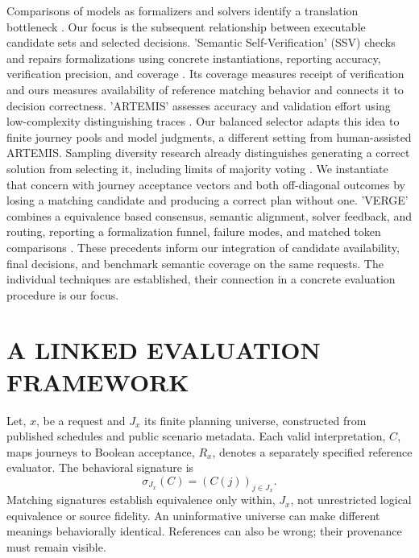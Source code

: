 \documentclass[a4paper,twoside]{article}
\begin{document}
Comparisons of models as formalizers and solvers identify a translation bottleneck \cite{amonkar}. Our focus is the subsequent relationship between executable candidate sets and selected decisions.
'Semantic Self-Verification' (SSV) checks and repairs formalizations using concrete instantiations, reporting accuracy, verification precision, and coverage \cite{ssv}. Its coverage measures receipt of verification and ours measures availability of reference matching behavior and connects it to decision correctness.
'ARTEMIS' assesses accuracy and validation effort using low-complexity distinguishing traces \cite{artemis}. Our balanced selector adapts this idea to finite journey pools and model judgments, a different setting from human-assisted ARTEMIS.
Sampling diversity research already distinguishes generating a correct solution from selecting it, including limits of majority voting \cite{diversity}. We instantiate that concern with journey acceptance vectors and both off-diagonal outcomes by losing a matching candidate and producing a correct plan without one.
'VERGE' combines a equivalence based consensus, semantic alignment, solver feedback, and routing, reporting a formalization funnel, failure modes, and matched token comparisons \cite{verge}. These precedents inform our integration of candidate availability, final decisions, and benchmark semantic coverage on the same requests. The individual techniques are established, their connection in a concrete evaluation procedure is our focus.



\section{\uppercase{A Linked Evaluation Framework}}
\label{sec:framework}

\noindent Let, $x$, be a request and $J_x$ its finite planning universe, constructed from published schedules and public scenario metadata. Each valid interpretation, $C$, maps journeys to Boolean acceptance, $R_x$, denotes a separately specified reference evaluator. The behavioral signature is
\begin{equation}
  \sigma_{J_x}(C)=(C(j))_{j\in J_x}.
\end{equation}
Matching signatures establish equivalence only within, $J_x$, not unrestricted logical equivalence or source fidelity. An uninformative universe can make different meanings behaviorally identical. References can also be wrong; their provenance must remain visible.
\end{document}
